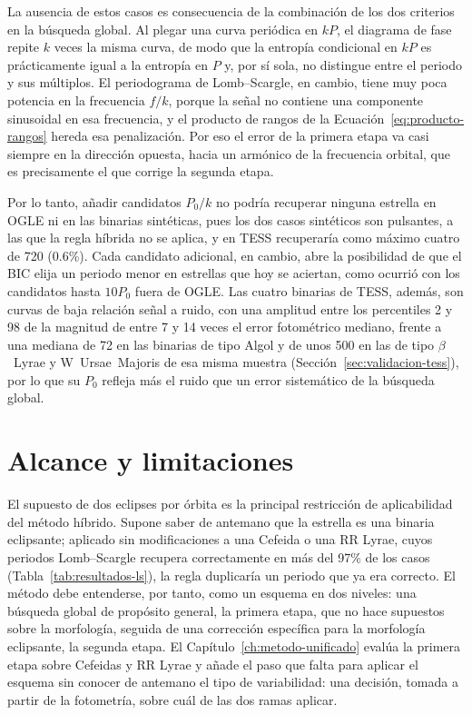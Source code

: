 \documentclass[12pt,letterpaper,oneside]{book}
\begin{document}
La ausencia de estos casos es consecuencia de la combinaci\'on de los dos criterios en la b\'usqueda global. Al plegar una curva peri\'odica en $kP$, el diagrama de fase repite $k$ veces la misma curva, de modo que la entrop\'ia condicional en $kP$ es pr\'acticamente igual a la entrop\'ia en $P$ y, por s\'i sola, no distingue entre el periodo y sus m\'ultiplos. El periodograma de Lomb--Scargle, en cambio, tiene muy poca potencia en la frecuencia $f/k$, porque la se\~nal no contiene una componente sinusoidal en esa frecuencia, y el producto de rangos de la Ecuaci\'on~\eqref{eq:producto-rangos} hereda esa penalizaci\'on. Por eso el error de la primera etapa va casi siempre en la direcci\'on opuesta, hacia un arm\'onico de la frecuencia orbital, que es precisamente el que corrige la segunda etapa.

Por lo tanto, a\~nadir candidatos $P_0/k$ no podr\'ia recuperar ninguna estrella en OGLE ni en las binarias sint\'eticas, pues los dos casos sint\'eticos son pulsantes, a las que la regla h\'ibrida no se aplica, y en TESS recuperar\'ia como m\'aximo cuatro de 720 (0.6\%). Cada candidato adicional, en cambio, abre la posibilidad de que el BIC elija un periodo menor en estrellas que hoy se aciertan, como ocurri\'o con los candidatos hasta $10P_0$ fuera de OGLE. Las cuatro binarias de TESS, adem\'as, son curvas de baja relaci\'on se\~nal a ruido, con una amplitud entre los percentiles 2 y 98 de la magnitud de entre 7 y 14 veces el error fotom\'etrico mediano, frente a una mediana de 72 en las binarias de tipo Algol y de unos 500 en las de tipo $\beta$~Lyrae y W~Ursae~Majoris de esa misma muestra (Secci\'on~\ref{sec:validacion-tess}), por lo que su $P_0$ refleja m\'as el ruido que un error sistem\'atico de la b\'usqueda global.

\section{Alcance y limitaciones}
\label{sec:hibrido-limitaciones}

El supuesto de dos eclipses por \'orbita es la principal restricci\'on de aplicabilidad del m\'etodo h\'ibrido. Supone saber de antemano que la estrella es una binaria eclipsante; aplicado sin modificaciones a una Cefeida o una RR Lyrae, cuyos periodos Lomb--Scargle recupera correctamente en m\'as del 97\% de los casos (Tabla~\ref{tab:resultados-ls}), la regla duplicar\'ia un periodo que ya era correcto. El m\'etodo debe entenderse, por tanto, como un esquema en dos niveles: una b\'usqueda global de prop\'osito general, la primera etapa, que no hace supuestos sobre la morfolog\'ia, seguida de una correcci\'on espec\'ifica para la morfolog\'ia eclipsante, la segunda etapa. El Cap\'itulo~\ref{ch:metodo-unificado} eval\'ua la primera etapa sobre Cefeidas y RR Lyrae y a\~nade el paso que falta para aplicar el esquema sin conocer de antemano el tipo de variabilidad: una decisi\'on, tomada a partir de la fotometr\'ia, sobre cu\'al de las dos ramas aplicar.
\end{document}
